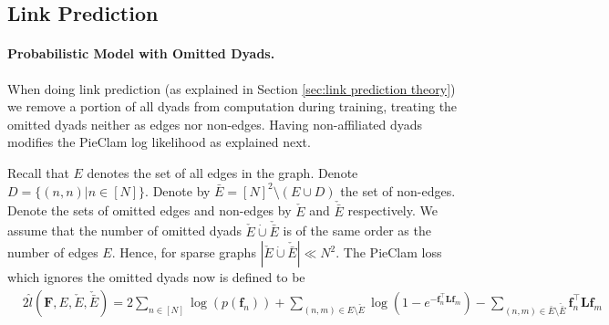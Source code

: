 \documentclass{article}
\theoremstyle{plain}
\theoremstyle{definition}
\theoremstyle{remark}
\newcommand{\ron}[1]{{{\textcolor{red}{\textbf{[Ron:} {#1}\textbf{]}}}}}
\begin{document}



\subsection{Link Prediction}
\label{sec: link prediction experiment}


\paragraph{Probabilistic Model with Omitted Dyads.} 
When doing link prediction (as explained in Section \ref{sec:link prediction theory}) we remove a portion of all dyads from computation during training, treating the omitted dyads neither as edges nor non-edges. Having non-affiliated dyads modifies the PieClam log likelihood as explained next.

Recall that $E$ denotes the set of all edges in the graph. Denote $D=\{(n,n)| n\in [N]\}$. Denote by  $\bar{E}=[N]^2\setminus (E\cup D)$ the set of non-edges. Denote the sets of omitted edges and non-edges by $\check{E}$ and $\check{\bar{E}}$ respectively. We assume that the number of omitted dyads $\check{E}\dot\cup\check{\bar{E}}$ is of the same order as the number of edges $E$. Hence, for sparse graphs $|\check{E}\dot\cup\check{\bar{E}}| \ll N^2$. %
The PieClam loss which ignores the omitted dyads now is defined to be
\begin{equation}
\begin{split}
&2\hat{l}(\mathbf{F}, E, \check{E},  \check{\bar{E}}) = 2\underset{n\in [N]}{\sum} \log(p(\mathbf{f}_n)) + \underset{(n,m)\in E\setminus\check{E}}{\sum} \log(1-e^{-\mathbf{f}_n^\top \mathbf{L} \mathbf{f}_m}) - \underset{(n,m)\in \bar{E}\setminus\check{\bar{E}}}{\sum} \mathbf{f}_n^\top \mathbf{L} \mathbf{f}_m
\end{split}
\end{equation}
\end{document}

